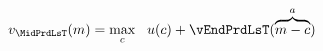 \begin{equation}\begin{gathered}\begin{aligned}
  \vFunc_{\MidPrdLsT}(\mNrm)  & = \max_{\cNrm} ~~ \uFunc(\cNrm) +
                              \vEndPrdLsT(\overbrace{\mNrm-\cNrm}^{\aNrm})
                              \label{eq:vEndTm1}
\end{aligned}\end{gathered}\end{equation}
